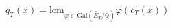 \documentclass[preview]{standalone}
\begin{document}
\begin{center}
$\displaystyle q_T(x) = \text{lcm}_{\varphi \in \text{Gal}\left(\widetilde{E_T}/\mathbb{Q}\right)} \varphi(c_T(x))$
\end{center}
\end{document}
